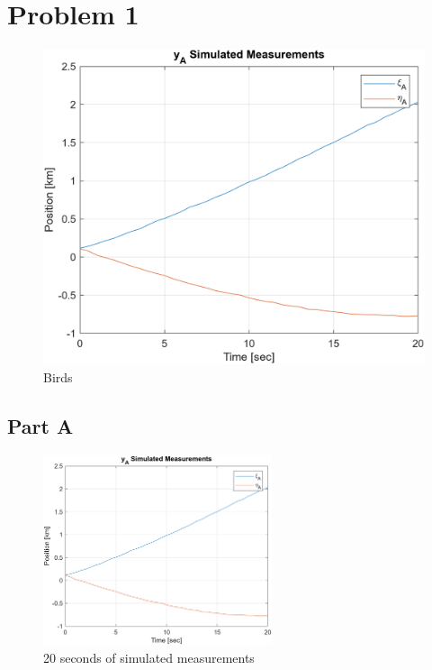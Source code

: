
\section{Problem 1}
\begin{figure}
    \begin{center}
      \includegraphics[width=0.8\linewidth]{figs/p2pa.png}
    \end{center}
    \caption{Birds}
\end{figure}
\lipsum[55]
\subsection{Part A}
%
\begin{remark}[test]
    \lipsum[55]
\end{remark}
%
\lipsum[23]
%
\begin{figure}[h!tbp]
    \centering
    \includegraphics[width=0.6\textwidth]{figs/p2pa.png}
    \caption{20 seconds of simulated measurements}
    \label{fig:p2_a}
\end{figure}
%
\lipsum[26]
%
\begin{definition}[test]
    \lipsum[44]
\end{definition}
%
\lipsum[32]
%
